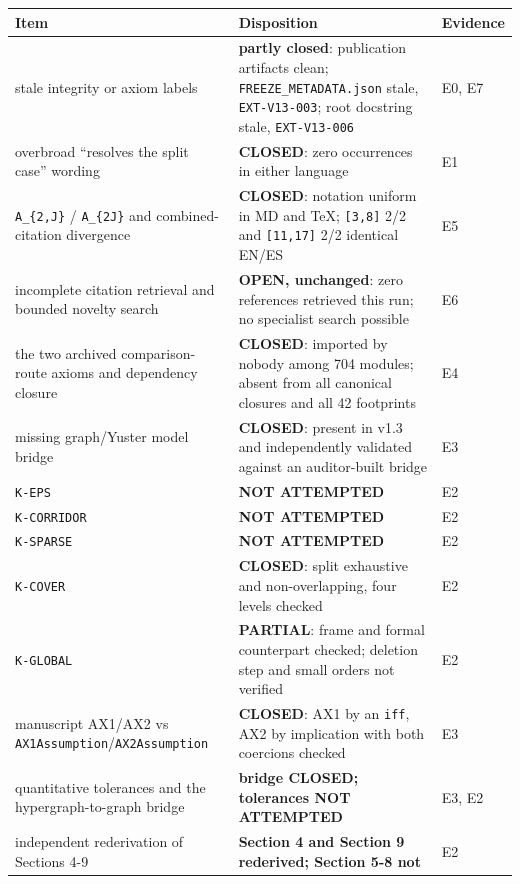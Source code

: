 \documentclass[
  10pt,
]{article}
\newcounter{none} %
\begin{document}
{\def\LTcaptype{none} %
\begin{longtable}[]{@{}
  >{\raggedright\arraybackslash}p{}
  >{\raggedright\arraybackslash}p{}
  >{\raggedright\arraybackslash}p{}@{}}
\toprule\noalign{}
\begin{minipage}[b]{\linewidth}\raggedright
Item
\end{minipage} & \begin{minipage}[b]{\linewidth}\raggedright
Disposition
\end{minipage} & \begin{minipage}[b]{\linewidth}\raggedright
Evidence
\end{minipage} \\
\midrule\noalign{}
\endhead
\bottomrule\noalign{}
\endlastfoot
stale integrity or axiom labels & \textbf{partly closed}: publication
artifacts clean; \texttt{FREEZE\_METADATA.json} stale,
\texttt{EXT-V13-003}; root docstring stale, \texttt{EXT-V13-006} & E0,
E7 \\
overbroad ``resolves the split case'' wording & \textbf{CLOSED}: zero
occurrences in either language & E1 \\
\texttt{A\_\{2,J\}} / \texttt{A\_\{2J\}} and combined-citation
divergence & \textbf{CLOSED}: notation uniform in MD and TeX;
\texttt{{[}3,8{]}} 2/2 and \texttt{{[}11,17{]}} 2/2 identical EN/ES &
E5 \\
incomplete citation retrieval and bounded novelty search & \textbf{OPEN,
unchanged}: zero references retrieved this run; no specialist search
possible & E6 \\
the two archived comparison-route axioms and dependency closure &
\textbf{CLOSED}: imported by nobody among 704 modules; absent from all
canonical closures and all 42 footprints & E4 \\
missing graph/Yuster model bridge & \textbf{CLOSED}: present in v1.3 and
independently validated against an auditor-built bridge & E3 \\
\texttt{K-EPS} & \textbf{NOT ATTEMPTED} & E2 \\
\texttt{K-CORRIDOR} & \textbf{NOT ATTEMPTED} & E2 \\
\texttt{K-SPARSE} & \textbf{NOT ATTEMPTED} & E2 \\
\texttt{K-COVER} & \textbf{CLOSED}: split exhaustive and
non-overlapping, four levels checked & E2 \\
\texttt{K-GLOBAL} & \textbf{PARTIAL}: frame and formal counterpart
checked; deletion step and small orders not verified & E2 \\
manuscript AX1/AX2 vs \texttt{AX1Assumption}/\texttt{AX2Assumption} &
\textbf{CLOSED}: AX1 by an \texttt{iff}, AX2 by implication with both
coercions checked & E3 \\
quantitative tolerances and the hypergraph-to-graph bridge &
\textbf{bridge CLOSED; tolerances NOT ATTEMPTED} & E3, E2 \\
independent rederivation of Sections 4-9 & \textbf{Section 4 and Section
9 rederived; Section 5-8 not} & E2 \\
\end{longtable}
}
\end{document}
